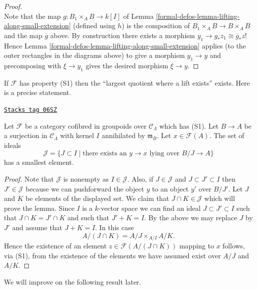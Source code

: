 \begin{proof}
$${}
$$
Note that the map $g : B_1 \times_A B \to k[I]$ of
Lemma \ref{formal-defos-lemma-lifting-along-small-extension}
(defined using $h$)
is the composition of $B_1 \times_A B \to B \times_A B$ and the map
$\overline{g}$ above. By construction there exists a morphism
$y_1 \to g_*z_1 \cong \overline{g}_*z$! Hence
Lemma \ref{formal-defos-lemma-lifting-along-small-extension}
applies (to the outer rectangles in the diagrams above)
to give a morphism $y_1 \to y$ and precomposing
with $\xi \to y_1$ gives the desired morphism $\xi \to y$.
\end{proof}

If $\mathcal{F}$ has property (S1) then the ``largest quotient where
a lift exists'' exists. Here is a precise statement.

\begin{lemma}
\label{formal-defos-lemma-largest-closed-where-lift}
\href{https://stacks.math.columbia.edu/tag/06SZ}{\texttt{Stacks tag 06SZ}}

Let $\mathcal{F}$ be a category cofibred in groupoids over
$\mathcal{C}_\Lambda$ which has (S1). Let $B \to A$ be a surjection
in $\mathcal{C}_\Lambda$ with kernel $I$ annihilated by $\mathfrak m_B$.
Let $x \in \mathcal{F}(A)$. The set of ideals
$$
\mathcal{J} = \{ J \subset I \mid
\text{there exists an }y \to x\text{ lying over }B/J \to A\}
$$
has a smallest element.
\end{lemma}

\begin{proof}
Note that $\mathcal{J}$ is nonempty as $I \in \mathcal{J}$.
Also, if $J \in \mathcal{J}$ and $J \subset J' \subset I$ then
$J' \in \mathcal{J}$ because we can pushforward the object $y$ to an
object $y'$ over $B/J'$. Let $J$ and $K$ be elements of the displayed set.
We claim that $J \cap K \in \mathcal{J}$ which will prove the lemma.
Since $I$ is a $k$-vector space we can find an ideal $J \subset J' \subset I$
such that $J \cap K = J' \cap K$ and such that $J' + K = I$. By the above
we may replace $J$ by $J'$ and assume that $J + K = I$. In this case
$$
A/(J \cap K) = A/J \times_{A/I} A/K.
$$
Hence the existence of an element $z \in \mathcal{F}(A/(J \cap K))$
mapping to $x$ follows, via (S1), from the existence of the elements we have
assumed exist over $A/J$ and $A/K$.
\end{proof}

We will improve on the following result later.

